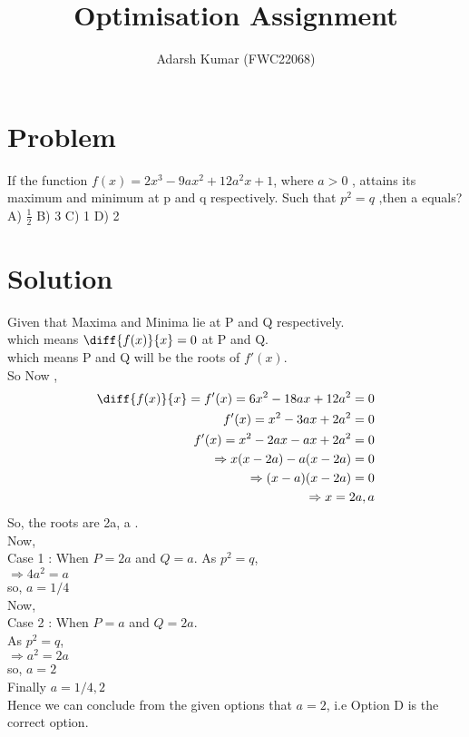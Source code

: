 \documentclass[journal,12pt,twocolumn]{IEEEtran}
\title{\mytitle}
\title
{ Optimisation Assignment 
}
\author{Adarsh Kumar (FWC22068)}
\begin{document}
\maketitle
\tableofcontents
\bigskip


\section{Problem}
If the function $ f(x) = 2x^3 -9ax^2+ 12a^2x+1 $, where $a > 0$ , attains its maximum and minimum at p and q respectively. Such that $ p^2 =q$ ,then a equals?
\linebreak
A) $\frac{1}{2}$ \hspace{2mm} B) 3\hspace{2mm}  C) 1  \hspace{2mm}D) 2\hspace{2mm}
\\

\section{Solution}
Given that Maxima and Minima lie at P and Q respectively.\\
 which means $ \diff{f(x)}{x} = 0$ at P and Q.\\
 which means P and Q will be the roots of $ f'(x)$.\\
 So Now ,\\
 \begin{align}
  \diff{f(x)}{x} = f'(x)= 6x^2 -18ax +12a^2 =0 \\
  f'(x)= x^2 -3ax +2a^2 =0 \\
 f'(x)= x^2 -2ax -ax +2a^2 =0 \\
  \Rightarrow  x(x-2a) -a(x-2a)=0 \\
   \Rightarrow (x-a)(x-2a)=0 \\
  \Rightarrow x = 2a , a\\
\end{align}
  So, the roots are 2a, a .\\
  
  Now,\\ 
Case 1 : When $P = 2a$ and $Q = a$.
As $p^2 =q$,\\
 $\Rightarrow 4a^2 = a $\\
 so, $ a= 1/4$\\
 Now,\\ 
Case 2 : When $P = a$ and $Q = 2a$.\\
 As $p^2 =q$,\\
 $\Rightarrow a^2 = 2a $\\
 so, $ a= 2$\\
 Finally $ a= 1/4 ,2 $\\
 Hence we can conclude from the given options that $a =2$,
 i.e Option D is the correct option.
 \newpage
\end{document}
